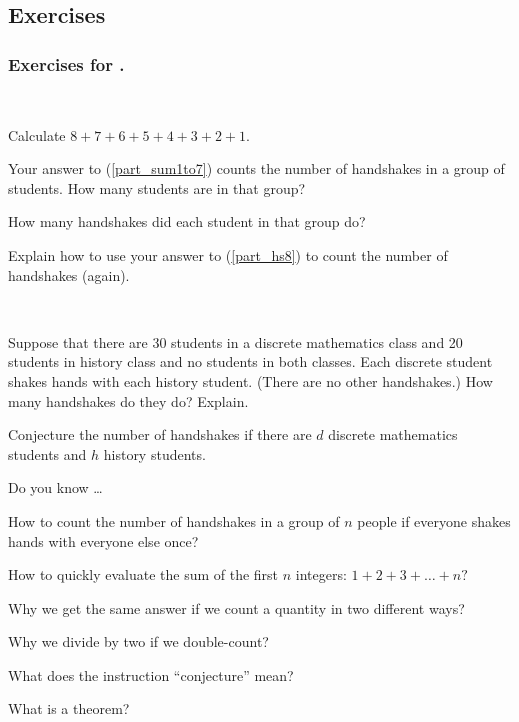 \subsection{Exercises}


\subsubsection{Exercises for  \subhs.} 

\begin{exer}[\exerP]%
\label{exer_handshakes_eight}
~
    \begin{exerpart}
        \item \label{part_sum1to7} Calculate $8+7+6+5+4+3+2+1$.
        \item Your answer to (\ref{part_sum1to7}) counts the number of handshakes in a group of students.  How many students are in that group?
        \item \label{part_hs8} How many handshakes did each student in that group do?
        \item Explain how to use your answer to (\ref{part_hs8}) to count the number of handshakes (again).
    \end{exerpart}
\end{exer}

\begin{exer} [\exerU]%
\label{exer_discrete_history_handshakes}
~
    \begin{exerpart}
    \item Suppose that there are 30 students in a discrete mathematics class and 20 students in history class and no students in both classes.  Each discrete student shakes hands with each history student. (There are no other handshakes.) How many handshakes do they do?  Explain.  
    \item Conjecture the number of handshakes if there are $d$ discrete mathematics students and $h$ history students.
    \end{exerpart}
\end{exer}

\begin{exer}[\exerR] %
\label{exer_dyk_count_hs}  
    Do you know \ldots 
        \begin{exerpart}
            \item How to count the number of handshakes in a group of $n$ people if everyone shakes hands with everyone else once?
            \item How to quickly evaluate the sum of the first $n$ integers:
                $1+2+3+\ldots+n?$
            \item Why we get the same answer if we count a quantity in two different ways?
            \item Why we divide by two if we double-count?
            \item What does the instruction ``conjecture'' mean?
            \item What is a theorem?
        \end{exerpart}
\end{exer}

